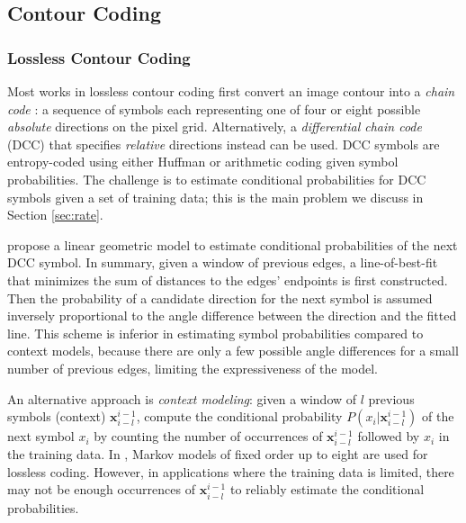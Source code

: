 \subsection{Contour Coding}
\label{subsec:related_contour_coding}

\subsubsection{Lossless Contour Coding}
\label{subsubsec:related_lossless}

Most works in lossless contour coding \cite{daribo14,freeman1978application,liu2005efficient,DCC1st1991,chan1995highly,estes1995efficient,turner1996efficient,egger1996region,jordan1998shape} first convert an image contour into a \textit{chain code} \cite{freeman1961}: a sequence of symbols each representing one of four or eight possible \textit{absolute} directions on the pixel grid. 
Alternatively, a \textit{differential chain code} (DCC) \cite{freeman1978application} that specifies \textit{relative} directions instead can be used.
DCC symbols are entropy-coded using either Huffman \cite{liu2005efficient} or arithmetic coding \cite{DCC1st1991} given symbol probabilities. 
The challenge is to estimate conditional probabilities for DCC symbols given a set of training data; this is the main problem we discuss in Section \ref{sec:rate}. 

\cite{daribo12icip,daribo14} propose a linear geometric model to estimate conditional probabilities of the next DCC symbol. 
In summary, given a window of previous edges, a line-of-best-fit that minimizes the sum of distances to the edges' endpoints is first constructed. Then the probability of a candidate direction for the next symbol is assumed inversely proportional to the angle difference between the direction and the fitted line. 
This scheme is inferior in estimating symbol probabilities compared to context models, because there are only a few possible angle differences for a small number of previous edges, limiting the expressiveness of the model.

An alternative approach is \textit{context modeling}: given a window of $l$ previous symbols (context) $\mathbf{x}^{i-1}_{i-l}$, compute the conditional probability $P(x_{i} | \mathbf{x}^{i-1}_{i-l})$ of the next symbol $x_{i}$ by counting the number of occurrences of $\mathbf{x}^{i-1}_{i-l}$ followed by $x_{i}$ in the training data. 
In \cite{kaneko1985encoding,DCC1st1991,chan1995highly,estes1995efficient,turner1996efficient}, Markov models of fixed order up to eight are used for lossless coding. 
However, in applications where the training data is limited, there may not be enough occurrences of $\mathbf{x}^{i-1}_{i-l}$ to reliably estimate the conditional probabilities. 

